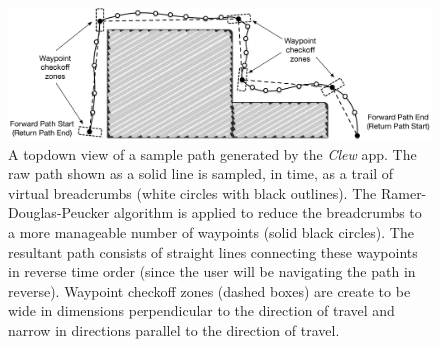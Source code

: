 \documentclass[chi_draft]{sigchi}
\begin{document}
\begin{figure}
\begin{center}
\includegraphics[width=0.9\linewidth]{Figures/samplepath}
\end{center}
\caption{A topdown view of a sample path generated by the \emph{Clew} app.  The raw path shown as a solid line is sampled, in time, as a trail of virtual breadcrumbs (white circles with black outlines).  The Ramer-Douglas-Peucker algorithm is applied to reduce the breadcrumbs to a more manageable number of waypoints (solid black circles).  The resultant path consists of straight lines connecting these waypoints in reverse time order (since the user will be navigating the path in reverse).  Waypoint checkoff zones (dashed boxes) are create to be wide in dimensions perpendicular to the direction of travel and narrow in directions parallel to the direction of travel.\label{fig:samplepath}}
\end{figure}
\end{document}

